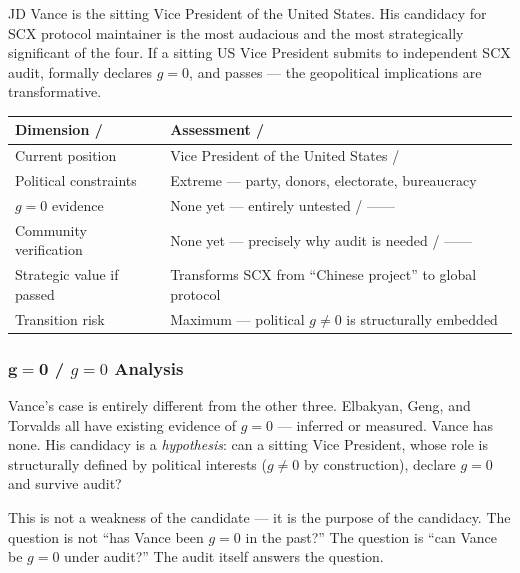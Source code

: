 \documentclass[12pt,a4paper]{article}
\theoremstyle{remark}
\begin{document}
JD Vance is the sitting Vice President of the United States. His candidacy
for SCX protocol maintainer is the most audacious and the most strategically
significant of the four. If a sitting US Vice President submits to independent
SCX audit, formally declares $g=0$, and passes — the geopolitical implications
are transformative.

\begin{center}
\begin{tabular}{p{} p{}}
\toprule
\textbf{Dimension / } & \textbf{Assessment / } \\
\midrule
Current position & Vice President of the United States /  \\
Political constraints & Extreme — party, donors, electorate, bureaucracy \\
$g=0$ evidence & None yet — entirely untested / —— \\
Community verification & None yet — precisely why audit is needed / —— \\
Strategic value if passed & Transforms SCX from ``Chinese project'' to global protocol \\
Transition risk & Maximum — political $g \neq 0$ is structurally embedded \\
\bottomrule
\end{tabular}
\end{center}

\subsubsection{$\mathbf{g=0}$  / $g=0$ Analysis}

Vance's case is entirely different from the other three. Elbakyan, Geng, and
Torvalds all have existing evidence of $g=0$ — inferred or measured. Vance
has none. His candidacy is a \textit{hypothesis}: can a sitting Vice President,
whose role is structurally defined by political interests ($g \neq 0$ by
construction), declare $g=0$ and survive audit?

This is not a weakness of the candidate — it is the purpose of the candidacy.
The question is not ``has Vance been $g=0$ in the past?'' The question is
``can Vance be $g=0$ under audit?'' The audit itself answers the question.
\end{document}
